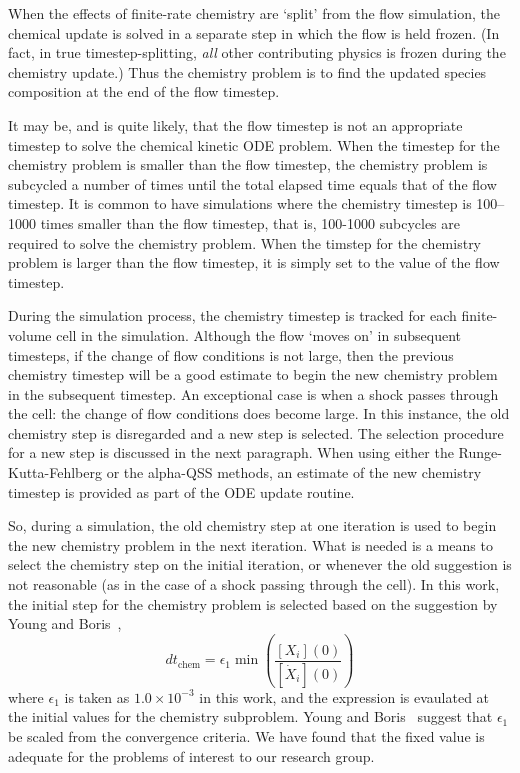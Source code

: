 \medskip
When the effects of finite-rate chemistry are `split' from the flow
simulation, the chemical update is solved in a separate step in
which the flow is held frozen. (In fact, in true timestep-splitting, \emph{all}
other contributing physics is frozen during the chemistry update.)
Thus the chemistry problem is to find the updated species composition
at the end of the flow timestep.

\medskip
It may be, and is quite likely, that the flow timestep is not
an appropriate timestep to solve the chemical kinetic ODE problem.
When the timestep for the chemistry problem is smaller than the
flow timestep, the chemistry problem is subcycled a number of times
until the total elapsed time equals that of the flow timestep.
It is common to have simulations where
the chemistry timestep is 100--1000 times smaller than the flow timestep,
that is, 100-1000 subcycles are required to solve the chemistry problem.
When the timstep for the chemistry problem is larger than the flow
timestep, it is simply set to the value of the flow timestep.

\medskip
During the simulation process, the chemistry timestep is tracked for each
finite-volume cell in the simulation.
Although the flow `moves on' in subsequent timesteps, if the change of flow conditions is not large,
then the previous chemistry timestep will be a good estimate to begin the
new chemistry problem in the subsequent timestep.
An exceptional case is when a shock passes through the cell: the change of flow
conditions does become large.
In this instance, the old chemistry step is disregarded and a new step is selected.
The selection procedure for a new step is discussed in the next paragraph.
When using either the Runge-Kutta-Fehlberg or the alpha-QSS methods, an estimate
of the new chemistry timestep is provided as part of the ODE update routine.

\medskip
So, during a simulation, the old chemistry step at one iteration is used to
begin the new chemistry problem in the next iteration.
What is needed is a means to select the chemistry step on the initial iteration,
or whenever the old suggestion is not reasonable (as in the case of a shock passing
through the cell).
In this work, the initial step for the chemistry problem is selected
based on the suggestion by Young and Boris~\cite{young_boris_77},
\begin{equation}
 dt_{\mbox{chem}} = \epsilon_1 \min \left( \frac{[X_i](0)}{[\dot{X}_i](0)} \right)
\end{equation}
where $\epsilon_1$ is taken as $1.0 \times 10^{-3}$ in this work,
and the expression is evaulated at the initial values for the chemistry
subproblem.
Young and Boris~\cite{young_boris_77} suggest that $\epsilon_1$
be scaled from the convergence criteria.
We have found that the fixed value is adequate for the problems
of interest to our research group.

